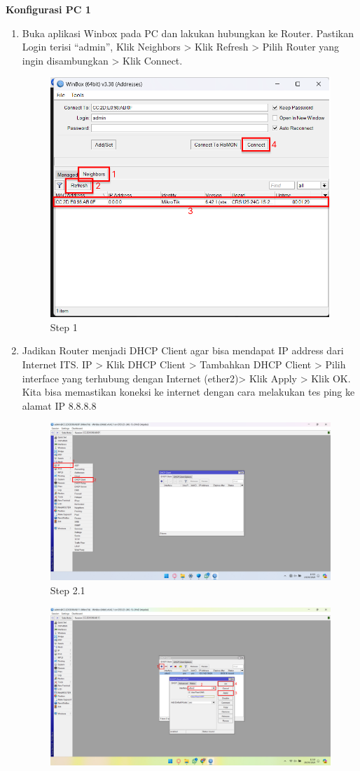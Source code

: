 \begin{center}
    \textbf{Konfigurasi PC 1}
    \begin{enumerate}
        \item Buka aplikasi Winbox pada PC dan lakukan hubungkan ke Router. Pastikan Login terisi “admin”, Klik Neighbors > Klik Refresh > Pilih Router yang ingin disambungkan > Klik Connect.
        \begin{figure}[H]
			\centering
			\includegraphics[width=0.5\linewidth]{P4/img/pc1/Step 1.png}
			\caption{Step 1}
			\label{fig:Step 1(PC 1)}
		\end{figure}
        \item Jadikan Router menjadi DHCP Client agar bisa mendapat IP address dari Internet ITS. IP > Klik DHCP Client > Tambahkan DHCP Client > Pilih interface yang terhubung dengan Internet (ether2)> Klik Apply > Klik OK. Kita bisa memastikan koneksi ke internet dengan cara melakukan tes ping ke alamat IP 8.8.8.8
        \begin{figure}[H]
			\centering
			\includegraphics[width=0.5\linewidth]{P4/img/pc1/Step 2.1.png}
			\caption{Step 2.1}
			\label{fig:Step 2.1(PC 1)}
        \end{figure}
        \begin{figure}[H]
			\centering
			\includegraphics[width=0.8\linewidth]{P4/img/pc1/Step 2.2.png}

\end{figure}
\end{enumerate}
\end{center}

